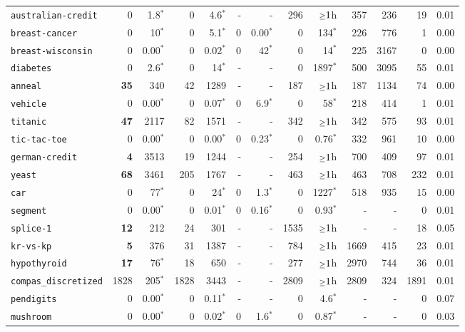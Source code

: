 \begin{tabular}{lrrrrrrrrrrrr}
\texttt{australian-credit} & 0 & 1.8$^*$ & 0 & 4.6$^*$ & - & - & 296 & $\mathsmaller{\geq}1$h & 357 & 236 & 19 & 0.01\\
\texttt{breast-cancer} & 0 & 10$^*$ & 0 & 5.1$^*$ & 0 & 0.00$^*$ & 0 & 134$^*$ & 226 & 776 & 1 & 0.00\\
\texttt{breast-wisconsin} & 0 & 0.00$^*$ & 0 & 0.02$^*$ & 0 & 42$^*$ & 0 & 14$^*$ & 225 & 3167 & 0 & 0.00\\
\texttt{diabetes} & 0 & 2.6$^*$ & 0 & 14$^*$ & - & - & 0 & 1897$^*$ & 500 & 3095 & 55 & 0.01\\
\texttt{anneal} & \textbf{35} & 340 & 42 & 1289 & - & - & 187 & $\mathsmaller{\geq}1$h & 187 & 1134 & 74 & 0.00\\
\texttt{vehicle} & 0 & 0.00$^*$ & 0 & 0.07$^*$ & 0 & 6.9$^*$ & 0 & 58$^*$ & 218 & 414 & 1 & 0.01\\
\texttt{titanic} & \textbf{47} & 2117 & 82 & 1571 & - & - & 342 & $\mathsmaller{\geq}1$h & 342 & 575 & 93 & 0.01\\
\texttt{tic-tac-toe} & 0 & 0.00$^*$ & 0 & 0.00$^*$ & 0 & 0.23$^*$ & 0 & 0.76$^*$ & 332 & 961 & 10 & 0.00\\
\texttt{german-credit} & \textbf{4} & 3513 & 19 & 1244 & - & - & 254 & $\mathsmaller{\geq}1$h & 700 & 409 & 97 & 0.01\\
\texttt{yeast} & \textbf{68} & 3461 & 205 & 1767 & - & - & 463 & $\mathsmaller{\geq}1$h & 463 & 708 & 232 & 0.01\\
\texttt{car} & 0 & 77$^*$ & 0 & 24$^*$ & 0 & 1.3$^*$ & 0 & 1227$^*$ & 518 & 935 & 15 & 0.00\\
\texttt{segment} & 0 & 0.00$^*$ & 0 & 0.01$^*$ & 0 & 0.16$^*$ & 0 & 0.93$^*$ & - & - & 0 & 0.01\\
\texttt{splice-1} & \textbf{12} & 212 & 24 & 301 & - & - & 1535 & $\mathsmaller{\geq}1$h & - & - & 18 & 0.05\\
\texttt{kr-vs-kp} & \textbf{5} & 376 & 31 & 1387 & - & - & 784 & $\mathsmaller{\geq}1$h & 1669 & 415 & 23 & 0.01\\
\texttt{hypothyroid} & \textbf{17} & 76$^*$ & 18 & 650 & - & - & 277 & $\mathsmaller{\geq}1$h & 2970 & 744 & 36 & 0.01\\
\texttt{compas\_discretized} & 1828 & 205$^*$ & 1828 & 3443 & - & - & 2809 & $\mathsmaller{\geq}1$h & 2809 & 324 & 1891 & 0.01\\
\texttt{pendigits} & 0 & 0.00$^*$ & 0 & 0.11$^*$ & - & - & 0 & 4.6$^*$ & - & - & 0 & 0.07\\
\texttt{mushroom} & 0 & 0.00$^*$ & 0 & 0.02$^*$ & 0 & 1.6$^*$ & 0 & 0.87$^*$ & - & - & 0 & 0.03\\

\end{tabular}

